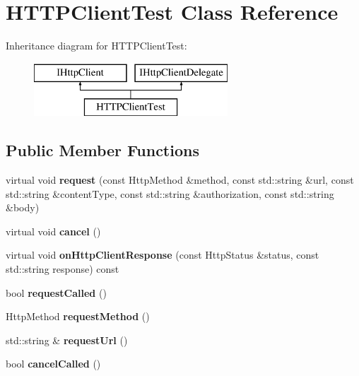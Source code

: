 \hypertarget{class_h_t_t_p_client_test}{}\section{H\+T\+T\+P\+Client\+Test Class Reference}
\label{class_h_t_t_p_client_test}
Inheritance diagram for H\+T\+T\+P\+Client\+Test\+:\begin{figure}[H]
\begin{center}
\leavevmode
\includegraphics[height=2.000000cm]{class_h_t_t_p_client_test}
\end{center}
\end{figure}
\subsection*{Public Member Functions}
\begin{DoxyCompactItemize}
\item 
\hypertarget{class_h_t_t_p_client_test_a21b069b062c267f1722a55f8ff3d14ff}{}\label{class_h_t_t_p_client_test_a21b069b062c267f1722a55f8ff3d14ff} 
virtual void {\bfseries request} (const Http\+Method \&method, const std\+::string \&url, const std\+::string \&content\+Type, const std\+::string \&authorization, const std\+::string \&body)
\item 
\hypertarget{class_h_t_t_p_client_test_a58a49d7d878eb625035b6e4e4e2068fe}{}\label{class_h_t_t_p_client_test_a58a49d7d878eb625035b6e4e4e2068fe} 
virtual void {\bfseries cancel} ()
\item 
\hypertarget{class_h_t_t_p_client_test_a0e3a62d3068d69df80ed6a34e5b942ea}{}\label{class_h_t_t_p_client_test_a0e3a62d3068d69df80ed6a34e5b942ea} 
virtual void {\bfseries on\+Http\+Client\+Response} (const Http\+Status \&status, const std\+::string response) const
\item 
\hypertarget{class_h_t_t_p_client_test_af7e572044539957f25b6d32905aa6951}{}\label{class_h_t_t_p_client_test_af7e572044539957f25b6d32905aa6951} 
bool {\bfseries request\+Called} ()
\item 
\hypertarget{class_h_t_t_p_client_test_ac361f9b5b0eecc9dad4994e8be6cac47}{}\label{class_h_t_t_p_client_test_ac361f9b5b0eecc9dad4994e8be6cac47} 
Http\+Method {\bfseries request\+Method} ()
\item 
\hypertarget{class_h_t_t_p_client_test_ab64e38d3f727071b439245f8f9b05084}{}\label{class_h_t_t_p_client_test_ab64e38d3f727071b439245f8f9b05084} 
std\+::string \& {\bfseries request\+Url} ()
\item 
\hypertarget{class_h_t_t_p_client_test_ad4e25b60d5ab9ce13afe8a0ca00435ee}{}\label{class_h_t_t_p_client_test_ad4e25b60d5ab9ce13afe8a0ca00435ee} 
bool {\bfseries cancel\+Called} ()
\end{DoxyCompactItemize}
